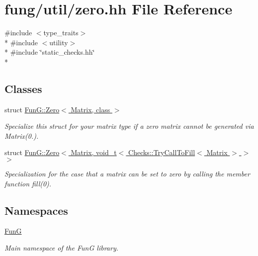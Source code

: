 \hypertarget{zero_8hh}{}\section{fung/util/zero.hh File Reference}
\label{zero_8hh}
{\ttfamily \#include $<$type\+\_\+traits$>$}\\*
{\ttfamily \#include $<$utility$>$}\\*
{\ttfamily \#include \char`\"{}static\+\_\+checks.\+hh\char`\"{}}\\*
\subsection*{Classes}
\begin{DoxyCompactItemize}
\item 
struct \hyperlink{structFunG_1_1Zero}{Fun\+G\+::\+Zero$<$ Matrix, class $>$}
\begin{DoxyCompactList}\small\item\em Specialize this struct for your matrix type if a zero matrix cannot be generated via Matrix(0.). \end{DoxyCompactList}\item 
struct \hyperlink{structFunG_1_1Zero_3_01Matrix_00_01void__t_3_01Checks_1_1TryCallToFill_3_01Matrix_01_4_01_4_01_4}{Fun\+G\+::\+Zero$<$ Matrix, void\+\_\+t$<$ Checks\+::\+Try\+Call\+To\+Fill$<$ Matrix $>$ $>$ $>$}
\begin{DoxyCompactList}\small\item\em Specialization for the case that a matrix can be set to zero by calling the member function fill(0). \end{DoxyCompactList}\end{DoxyCompactItemize}
\subsection*{Namespaces}
\begin{DoxyCompactItemize}
\item 
 \hyperlink{namespaceFunG}{Fun\+G}
\begin{DoxyCompactList}\small\item\em Main namespace of the Fun\+G library. \end{DoxyCompactList}\end{DoxyCompactItemize}
